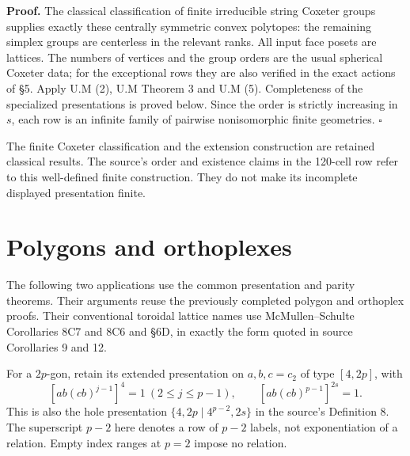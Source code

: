 \textbf{Proof.} The classical classification of finite irreducible string Coxeter groups supplies exactly these centrally symmetric convex polytopes: the remaining simplex groups are centerless in the relevant ranks. All input face posets are lattices. The numbers of vertices and the group orders are the usual spherical Coxeter data; for the exceptional rows they are also verified in the exact actions of §5. Apply U.M (2), U.M Theorem 3 and U.M (5). Completeness of the specialized presentations is proved below. Since the order is strictly increasing in \(s\), each row is an infinite family of pairwise nonisomorphic finite geometries. $\square$

The finite Coxeter classification and the extension construction are retained classical results. The source's order and existence claims in the 120-cell row refer to this well-defined finite construction. They do not make its incomplete displayed presentation finite.

\section{Polygons and orthoplexes}\label{polygons-and-orthoplexes}

The following two applications use the common presentation and parity theorems. Their arguments reuse the previously completed polygon and orthoplex proofs. Their conventional toroidal lattice names use McMullen--Schulte Corollaries 8C7 and 8C6 and §6D, in exactly the form quoted in source Corollaries 9 and 12.

For a \(2p\)-gon, retain its extended presentation on \(a,b,c=c_2\) of type \([4,2p]\), with
\[
 [ab(cb)^{j-1}]^4=1\ (2\le j\le p-1),\qquad
 [ab(cb)^{p-1}]^{2s}=1.                       \tag{3}
\]
This is also the hole presentation \(\{4,2p\mid4^{p-2},2s\}\) in the source's Definition 8. The superscript \(p-2\) here denotes a row of \(p-2\) labels, not exponentiation of a relation. Empty index ranges at \(p=2\) impose no relation.

